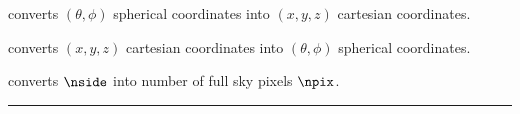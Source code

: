 \begin{related}
  \begin{sulist}{} %
  \item[\htmlref{ang2vec}{csub:ang2vec}] converts $(\theta,\phi)$ spherical coordinates into $(x,y,z)$ cartesian coordinates.
  \item[\htmlref{vec2ang}{csub:vec2ang}] converts $(x,y,z)$ cartesian coordinates into $(\theta,\phi)$ spherical coordinates.
  \item[\htmlref{npix2nside}{csub:npix2nside}] converts $\nside$ into number of
full sky pixels $\npix$.
  \end{sulist}
\end{related}

\rule{\hsize}{2mm}

